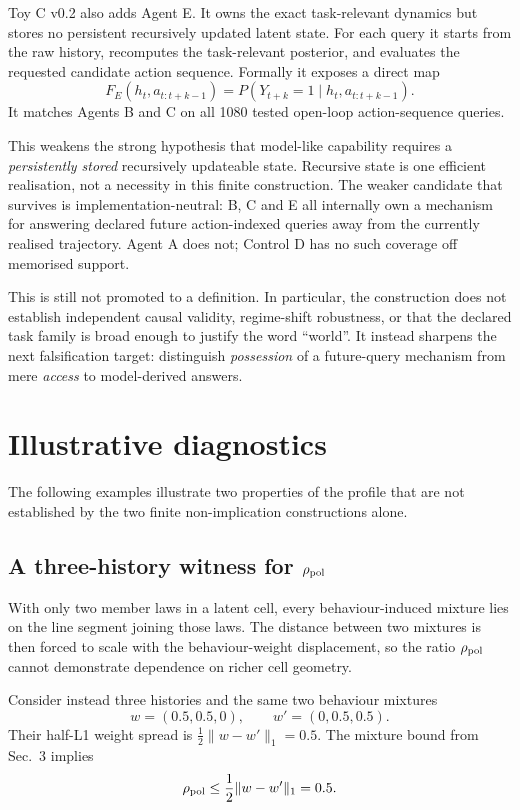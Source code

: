 \documentclass[10pt]{article}
\begin{document}
Toy C v0.2 also adds Agent E. It owns the exact task-relevant dynamics but stores no persistent recursively updated latent state. For each query it starts from the raw history, recomputes the task-relevant posterior, and evaluates the requested candidate action sequence. Formally it exposes a direct map
\[
F_E(h_t,a_{t:t+k-1})
=
P(Y_{t+k}=1\mid h_t,a_{t:t+k-1}).
\]
It matches Agents B and C on all 1080 tested open-loop action-sequence queries.

This weakens the strong hypothesis that model-like capability requires a \emph{persistently stored} recursively updateable state. Recursive state is one efficient realisation, not a necessity in this finite construction. The weaker candidate that survives is implementation-neutral: B, C and E all internally own a mechanism for answering declared future action-indexed queries away from the currently realised trajectory. Agent A does not; Control D has no such coverage off memorised support.

This is still not promoted to a definition. In particular, the construction does not establish independent causal validity, regime-shift robustness, or that the declared task family is broad enough to justify the word ``world''. It instead sharpens the next falsification target: distinguish \emph{possession} of a future-query mechanism from mere \emph{access} to model-derived answers.

\section{Illustrative diagnostics}

The following examples illustrate two properties of the profile that are not established by the two finite non-implication constructions alone.

\subsection{A three-history witness for $\rho_{\rm pol}$}
\label{sec:rho3}

With only two member laws in a latent cell, every behaviour-induced mixture lies on the line segment joining those laws. The distance between two mixtures is then forced to scale with the behaviour-weight displacement, so the ratio $\rho_{\rm pol}$ cannot demonstrate dependence on richer cell geometry.

Consider instead three histories and the same two behaviour mixtures
\[
w=(0.5,0.5,0),
\qquad
w'=(0,0.5,0.5).
\]
Their half-L1 weight spread is $\tfrac12\lVert w-w'\rVert_1=0.5$. The mixture bound from Sec.~3 implies
\[
\rho_{\rm pol}\le \frac12\lVert w-w'\rVert_1=0.5.
\]
\end{document}
